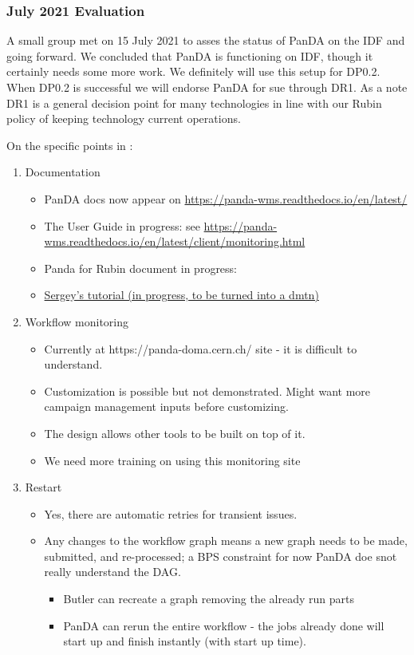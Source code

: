 \subsubsection{July 2021 Evaluation}
A small group met on 15 July 2021 to asses the status of PanDA on the IDF and going forward.
We  concluded  that PanDA is functioning on IDF, though it certainly needs some more work.
We definitely will use this setup for DP0.2.
When DP0.2 is  successful we will endorse PanDA for sue  through DR1.
As a note DR1 is a general decision point for many technologies in line with our Rubin policy of keeping technology current operations.

On the specific points in :
\begin{enumerate}
\item Documentation
\begin{itemize}
\item PanDA docs now appear on \url{https://panda-wms.readthedocs.io/en/latest/}
\item The User Guide in progress:  see \url{https://panda-wms.readthedocs.io/en/latest/client/monitoring.html}
\item Panda for Rubin document in progress: 
\item \href{https://docs.google.com/document/d/1J0Dxe_TJoIpWQm_izBY4Cz6mWkgLCVTZB6pZxkjS0Gg/edit}{ Sergey’s tutorial (in progress, to be turned into a dmtn) }
\end{itemize}
\item Workflow monitoring
\begin{itemize}
\item Currently at https://panda-doma.cern.ch/ site - it is difficult to understand.
\item Customization is possible but not demonstrated. Might want more campaign management inputs before customizing.
\item The design allows other tools to be built on top of it.
\item We need more training on using this monitoring site
\end{itemize}
\item Restart
\begin{itemize}
\item  Yes, there are automatic retries for transient issues.
\item Any changes to the workflow graph means a new graph needs to be made, submitted, and re-processed;  a BPS constraint for now PanDA doe snot really understand the DAG.
\begin{itemize}
\item Butler can recreate a graph removing the already run parts
\item PanDA can rerun the entire workflow - the jobs already done will start up and finish instantly (with start up time).
\end{itemize}


\end{itemize}
\end{enumerate}
